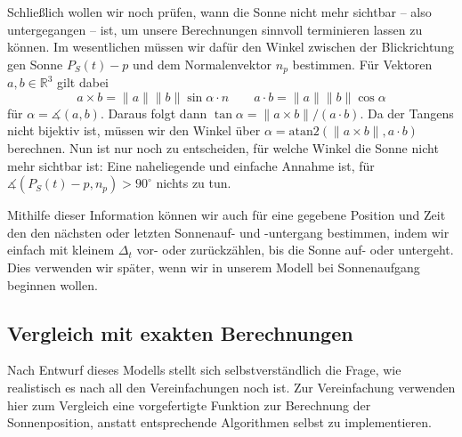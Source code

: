 \documentclass[
    paper=a4,
    DIV14,
    fontsize=12pt,
    pagesize=pdftex,
    toc=bibliographynumbered
]{scrartcl}
\numberwithin{figure}{section}
\numberwithin{equation}{section}
\numberwithin{table}{section}
\newcommand*\setR{\mathds{R}}
\begin{document}
Schließlich wollen wir noch prüfen, wann die Sonne nicht mehr sichtbar -- also
untergegangen -- ist, um unsere Berechnungen sinnvoll terminieren lassen zu können.
Im wesentlichen müssen wir dafür den Winkel zwischen der Blickrichtung gen Sonne
$P_S(t) - p$ und dem Normalenvektor $n_p$ bestimmen. Für Vektoren $a, b\in \setR^3$ gilt
dabei
\begin{equation*}
    a\times b = \|a\|\|b\| \sin \alpha \cdot n \qquad
    a \cdot b = \|a\|\|b\| \cos \alpha
\end{equation*}
für $\alpha = \measuredangle(a, b)$. Daraus folgt dann $\tan\alpha = \|a\times b\|/(a\cdot
b)$. Da der Tangens nicht bijektiv ist, müssen wir den Winkel über $\alpha =
\mathrm{atan2}(\|a\times b\|, a\cdot b)$ berechnen. Nun ist nur noch zu entscheiden, für
welche Winkel die Sonne nicht mehr sichtbar ist: Eine naheliegende und einfache Annahme
ist, für $\measuredangle(P_S(t) - p, n_p) > 90^\circ$ nichts zu tun.

Mithilfe dieser Information können wir auch für eine gegebene Position und Zeit den den
nächsten oder letzten Sonnenauf- und -untergang bestimmen, indem wir einfach mit kleinem
$\Delta_t$ vor- oder zurückzählen, bis die Sonne auf- oder untergeht. Dies verwenden wir
später, wenn wir in unserem Modell bei Sonnenaufgang beginnen wollen.

\subsection{Vergleich mit exakten Berechnungen}
Nach Entwurf dieses Modells stellt sich selbstverständlich die Frage, wie realistisch es
nach all den Vereinfachungen noch ist. Zur Vereinfachung verwenden hier zum Vergleich eine
vorgefertigte Funktion zur Berechnung der Sonnenposition, anstatt entsprechende
Algorithmen selbst zu implementieren.
\end{document}
